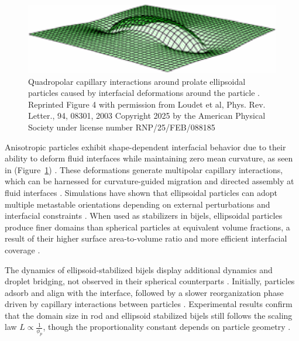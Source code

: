 \begin{figure}
    \centering
    \includegraphics[scale = 0.5]{figures/literature_review/interfacial_curvature.png}
    \caption{Quadropolar capillary interactions around prolate ellipsoidal particles caused by interfacial deformations 
             around the particle \cite{loudet_capillary_2005}. Reprinted Figure 4 with permission from
             Loudet et al, Phys. Rev. Letter., 94, 08301, 2003 Copyright 2025 by the American Physical Society under license number RNP/25/FEB/088185}
    \label{fig:anisotropic_particle_interface}
\end{figure}

Anisotropic particles exhibit shape-dependent interfacial behavior due to their ability to deform fluid interfaces while maintaining zero mean curvature, as seen in 
(Figure~\ref{fig:anisotropic_particle_interface}) \cite{loudet_capillary_2005, cheng_shape-anisotropic_2013}. These deformations generate multipolar capillary interactions, which can be harnessed 
for curvature-guided migration and directed assembly at fluid interfaces \cite{cavallaro_curvature-driven_2011, read_dimerization_2020, sharifi-mood_curvature_2015}. Simulations have shown that 
ellipsoidal particles can adopt multiple metastable orientations depending on external perturbations and interfacial constraints \cite{gunther_lattice_2013}. When used as stabilizers in bijels, 
ellipsoidal particles produce finer domains than spherical particles at equivalent volume fractions, a result of their higher surface area-to-volume ratio and more efficient interfacial coverage 
\cite{gunther_timescales_2014}.

The dynamics of ellipsoid-stabilized bijels display additional dynamics and droplet bridging, not observed in their spherical counterparts \cite{gunther_timescales_2014, witt_bijel_2013}. Initially, 
particles adsorb and align with the interface, followed by a slower reorganization phase driven by capillary interactions between particles \cite{gunther_timescales_2014}. Experimental results 
confirm that the domain size in rod and ellipsoid stabilized bijels still follows the scaling law $L \propto \frac{1}{\phi_p}$, though the proportionality constant depends on particle geometry 
\cite{hijnen_bijels_2015, madivala_exploiting_2009, daware_emulsions_2015}.

